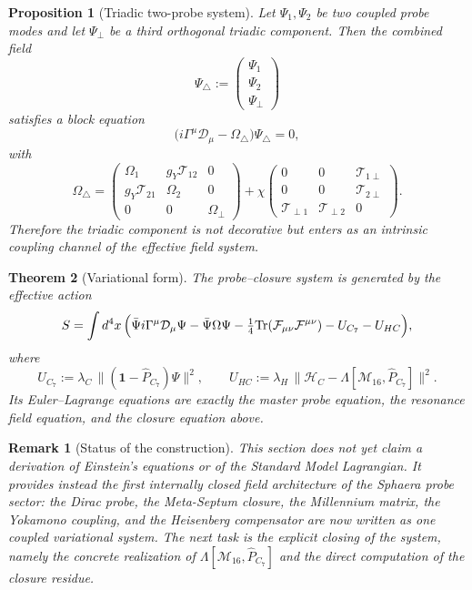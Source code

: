 \documentclass[12pt,a4paper]{article}
\newtheorem{theorem}{Theorem}[section]
\newtheorem{proposition}[theorem]{Proposition}
\newtheorem*{remark}{Remark}
\begin{document}
\begin{proposition}[Triadic two-probe system]
Let $\Psi_1,\Psi_2$ be two coupled probe modes and let $\Psi_\perp$ be a
third orthogonal triadic component.
Then the combined field
\[
  \Psi_{\triangle}
  :=
  \begin{pmatrix}
    \Psi_1\\
    \Psi_2\\
    \Psi_\perp
  \end{pmatrix}
\]
satisfies a block equation
\[
  \bigl(i\Gamma^\mu\mathcal D_\mu - \Omega_{\triangle}\bigr)
  \Psi_{\triangle}=0,
\]
with
\[
  \Omega_{\triangle}
  =
  \begin{pmatrix}
    \Omega_1 & g_Y\mathcal T_{12} & 0\\
    g_Y\mathcal T_{21} & \Omega_2 & 0\\
    0 & 0 & \Omega_\perp
  \end{pmatrix}
  +
  \chi
  \begin{pmatrix}
    0 & 0 & \mathcal T_{1\perp}\\
    0 & 0 & \mathcal T_{2\perp}\\
    \mathcal T_{\perp1} & \mathcal T_{\perp2} & 0
  \end{pmatrix}.
\]
Therefore the triadic component is not decorative but enters as an
intrinsic coupling channel of the effective field system.
\end{proposition}

\begin{theorem}[Variational form]
The probe--closure system is generated by the effective action
\[
  S
  =
  \int d^4x\,
  \Bigl(
    \bar\Psi i\Gamma^\mu\mathcal D_\mu\Psi
    - \bar\Psi\Omega\Psi
    - \tfrac14\mathrm{Tr}(\mathcal F_{\mu\nu}\mathcal F^{\mu\nu})
    - U_{C_7}
    - U_{HC}
  \Bigr),
\]
where
\[
  U_{C_7}
  :=
  \lambda_C\,
  \bigl\|(\mathbf 1-\hat P_{C_7})\Psi\bigr\|^2,
  \qquad
  U_{HC}
  :=
  \lambda_H\,
  \bigl\|\mathcal H_C - \Lambda[\mathcal M_{16},\hat P_{C_7}]\bigr\|^2.
\]
Its Euler--Lagrange equations are exactly the master probe equation,
the resonance field equation, and the closure equation above.
\end{theorem}

\begin{remark}[Status of the construction]
This section does not yet claim a derivation of Einstein's equations or
of the Standard Model Lagrangian.
It provides instead the first internally closed field architecture of
the Sphaera probe sector: the Dirac probe, the Meta-Septum closure, the
Millennium matrix, the Yokamono coupling, and the Heisenberg
compensator are now written as one coupled variational system.
The next task is the explicit closing of the system, namely the concrete
realization of $\Lambda[\mathcal M_{16},\hat P_{C_7}]$ and the direct
computation of the closure residue.

\end{remark}
\end{document}
